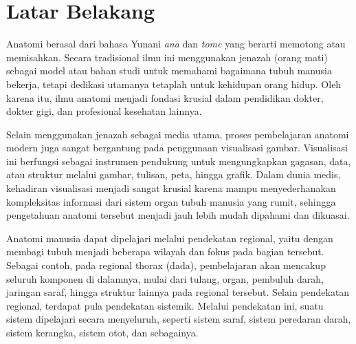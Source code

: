 \documentclass[a4paper,twoside]{article}
\begin{document}
\section{Latar Belakang}
        Anatomi berasal dari bahasa Yunani \textit{ana} dan \textit{tome} yang berarti memotong atau memisahkan. Secara tradisional ilmu ini menggunakan jenazah (orang mati) sebagai model atau bahan studi untuk memahami bagaimana tubuh manusia bekerja, tetapi dedikasi utamanya tetaplah untuk kehidupan orang hidup. Oleh karena itu, ilmu anatomi menjadi fondasi krusial dalam pendidikan dokter, dokter gigi, dan profesional kesehatan lainnya.
        
        Selain menggunakan jenazah sebagai media utama, proses pembelajaran anatomi modern juga sangat bergantung pada penggunaan visualisasi gambar. Visualisasi ini berfungsi sebagai instrumen pendukung untuk mengungkapkan gagasan, data, atau struktur melalui gambar, tulisan, peta, hingga grafik. Dalam dunia medis, kehadiran visualisasi menjadi sangat krusial karena mampu menyederhanakan kompleksitas informasi dari sistem organ tubuh manusia yang rumit, sehingga pengetahuan anatomi tersebut menjadi jauh lebih mudah dipahami dan dikuasai.

        Anatomi manusia dapat dipelajari melalui pendekatan regional, yaitu dengan membagi tubuh menjadi beberapa wilayah dan fokus pada bagian tersebut. Sebagai contoh, pada regional thorax (dada), pembelajaran akan mencakup seluruh komponen di dalamnya, mulai dari tulang, organ, pembuluh darah, jaringan saraf, hingga struktur lainnya pada regional tersebut. Selain pendekatan regional, terdapat pula pendekatan sistemik. Melalui pendekatan ini, suatu sistem dipelajari secara menyeluruh, seperti sistem saraf, sistem peredaran darah, sistem kerangka, sistem otot, dan sebagainya.
        
    
\end{document}
